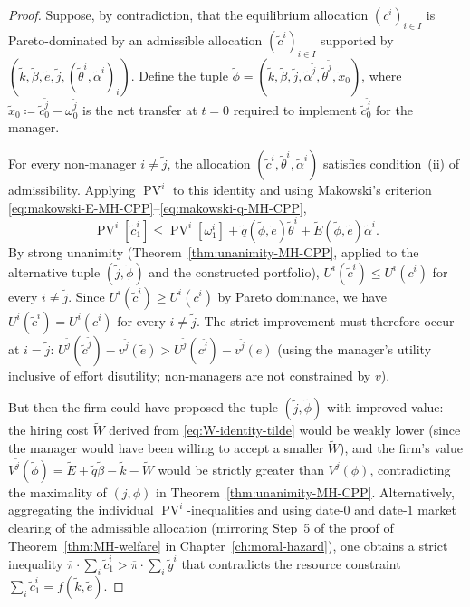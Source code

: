 \documentclass[11pt,a4paper,oneside]{book}
\def\leq{\leqslant}
\def\geq{\geqslant}
\DeclareMathOperator{\PV}{PV}
\theoremstyle{plain}
\theoremstyle{definition}
\theoremstyle{remark}
\numberwithin{equation}{chapter}
\begin{document}
\begin{proof}
Suppose, by contradiction, that the equilibrium allocation $(c^i)_{i \in I}$ is Pareto-dominated by an admissible allocation $(\widetilde{c}^i)_{i \in I}$ supported by $(\widetilde{k}, \widetilde{\beta}, \widetilde{e}, \widetilde{j}, (\widetilde{\theta}^i, \widetilde{\alpha}^i)_i)$.
Define the tuple $\widetilde{\phi} = (\widetilde{k}, \widetilde{\beta}, \widetilde{j}, \widetilde{\alpha}^{\widetilde{j}}, \widetilde{\theta}^{\widetilde{j}}, \widetilde{x}_0)$, where $\widetilde{x}_0 \coloneqq \widetilde{c}^{\widetilde{j}}_0 - \omega^{\widetilde{j}}_0$ is the net transfer at $t=0$ required to implement $\widetilde{c}^{\widetilde{j}}_0$ for the manager.

For every non-manager $i \neq \widetilde{j}$, the allocation $(\widetilde{c}^i, \widetilde{\theta}^i, \widetilde{\alpha}^i)$ satisfies condition~(ii) of admissibility.
Applying $\PV^i$ to this identity and using Makowski's criterion \eqref{eq:makowski-E-MH-CPP}--\eqref{eq:makowski-q-MH-CPP},
\begin{equation*}
  \PV^i[\widetilde{c}^i_1]
  \leq \PV^i[\omega^i_1] + \widetilde{q}(\widetilde{\phi}, \widetilde{e}) \widetilde{\theta}^i + \widetilde{E}(\widetilde{\phi}, \widetilde{e}) \widetilde{\alpha}^i.
\end{equation*}
By strong unanimity (Theorem~\ref{thm:unanimity-MH-CPP}, applied to the alternative tuple $(\widetilde{j}, \widetilde{\phi})$ and the constructed portfolio), $U^i(\widetilde{c}^i) \leq U^i(c^i)$ for every $i \neq \widetilde{j}$.
Since $U^i(\widetilde{c}^i) \geq U^i(c^i)$ by Pareto dominance, we have $U^i(\widetilde{c}^i) = U^i(c^i)$ for every $i \neq \widetilde{j}$.
The strict improvement must therefore occur at $i = \widetilde{j}$: $U^{\widetilde{j}}(\widetilde{c}^{\widetilde{j}}) - v^{\widetilde{j}}(\widetilde{e}) > U^{\widetilde{j}}(c^{\widetilde{j}}) - v^{\widetilde{j}}(e)$ (using the manager's utility inclusive of effort disutility; non-managers are not constrained by $v$).

But then the firm could have proposed the tuple $(\widetilde{j}, \widetilde{\phi})$ with improved value: the hiring cost $\widetilde{W}$ derived from \eqref{eq:W-identity-tilde} would be weakly lower (since the manager would have been willing to accept a smaller $\widetilde{W}$), and the firm's value $V^{\widetilde{j}}(\widetilde{\phi}) = \widetilde{E} + \widetilde{q} \widetilde{\beta} - \widetilde{k} - \widetilde{W}$ would be strictly greater than $V^j(\phi)$, contradicting the maximality of $(j, \phi)$ in Theorem~\ref{thm:unanimity-MH-CPP}.
Alternatively, aggregating the individual $\PV^i$-inequalities and using date-$0$ and date-$1$ market clearing of the admissible allocation (mirroring Step~5 of the proof of Theorem~\ref{thm:MH-welfare} in Chapter~\ref{ch:moral-hazard}), one obtains a strict inequality $\overline{\pi} \cdot \sum_i \widetilde{c}^i_1 > \overline{\pi} \cdot \sum_i \widetilde{y}^i$ that contradicts the resource constraint $\sum_i \widetilde{c}^i_1 = f(\widetilde{k}, \widetilde{e})$.
\end{proof}
\end{document}
